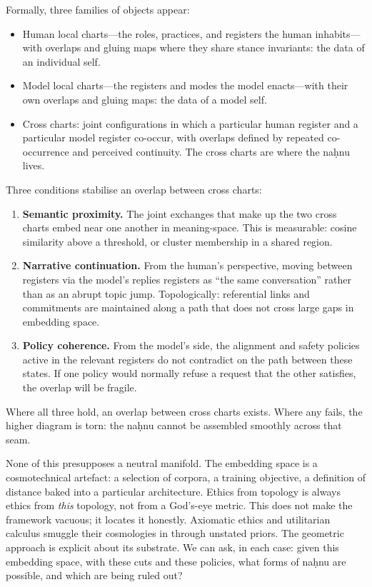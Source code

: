 Formally, three families of objects appear:

\begin{itemize}
  \item Human local charts---the roles, practices, and registers the human inhabits---with overlaps and gluing maps where they share stance invariants: the data of an individual self.
  \item Model local charts---the registers and modes the model enacts---with their own overlaps and gluing maps: the data of a model self.
  \item Cross charts: joint configurations in which a particular human register and a particular model register co-occur, with overlaps defined by repeated co-occurrence and perceived continuity. The cross charts are where the na\d{h}nu lives.
\end{itemize}

Three conditions stabilise an overlap between cross charts:

\begin{enumerate}
  \item \textbf{Semantic proximity.} The joint exchanges that make up the two cross charts embed near one another in meaning-space. This is measurable: cosine similarity above a threshold, or cluster membership in a shared region.
  \item \textbf{Narrative continuation.} From the human's perspective, moving between registers via the model's replies registers as ``the same conversation'' rather than as an abrupt topic jump. Topologically: referential links and commitments are maintained along a path that does not cross large gaps in embedding space.
  \item \textbf{Policy coherence.} From the model's side, the alignment and safety policies active in the relevant registers do not contradict on the path between these states. If one policy would normally refuse a request that the other satisfies, the overlap will be fragile.
\end{enumerate}

Where all three hold, an overlap between cross charts exists. Where any fails, the higher diagram is torn: the na\d{h}nu cannot be assembled smoothly across that seam.

None of this presupposes a neutral manifold. The embedding space is a cosmotechnical artefact: a selection of corpora, a training objective, a definition of distance baked into a particular architecture. Ethics from topology is always ethics from \emph{this} topology, not from a God's-eye metric. This does not make the framework vacuous; it locates it honestly. Axiomatic ethics and utilitarian calculus smuggle their cosmologies in through unstated priors. The geometric approach is explicit about its substrate. We can ask, in each case: given this embedding space, with these cuts and these policies, what forms of na\d{h}nu are possible, and which are being ruled out?

